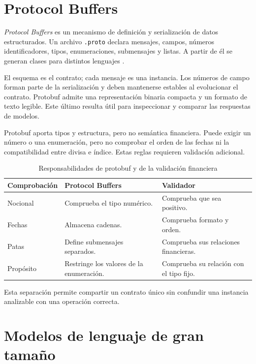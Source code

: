 \section{Protocol Buffers}
\label{sec:protocol_buffers}

\textit{Protocol Buffers} es un mecanismo de definición y serialización de datos estructurados. Un archivo \texttt{.proto} declara mensajes, campos, números identificadores, tipos, enumeraciones, submensajes y listas. A partir de él se generan clases para distintos lenguajes \citep{protobuf-overview,google-protobuf-doc}.

El esquema es el contrato; cada mensaje es una instancia. Los números de campo forman parte de la serialización y deben mantenerse estables al evolucionar el contrato. Protobuf admite una representación binaria compacta y un formato de texto legible. Este último resulta útil para inspeccionar y comparar las respuestas de modelos.

Protobuf aporta tipos y estructura, pero no semántica financiera. Puede exigir un número o una enumeración, pero no comprobar el orden de las fechas ni la compatibilidad entre divisa e índice. Estas reglas requieren validación adicional.

\begin{table}[H]
\centering
\small
\caption{Responsabilidades de protobuf y de la validación financiera}
\label{tab:protobuf_validacion}
\begin{tabular}{|P{4.0cm}|P{4.4cm}|P{4.4cm}|}
\hline
\textbf{Comprobación} & \textbf{Protocol Buffers} & \textbf{Validador} \\
\hline
Nocional & Comprueba el tipo numérico. & Comprueba que sea positivo. \\
\hline
Fechas & Almacena cadenas. & Comprueba formato y orden. \\
\hline
Patas & Define submensajes separados. & Comprueba sus relaciones financieras. \\
\hline
Propósito & Restringe los valores de la enumeración. & Comprueba su relación con el tipo fijo. \\
\hline
\end{tabular}
\end{table}

Esta separación permite compartir un contrato único sin confundir una instancia analizable con una operación correcta.

\section{Modelos de lenguaje de gran tamaño}
\label{sec:modelos_lenguaje}

